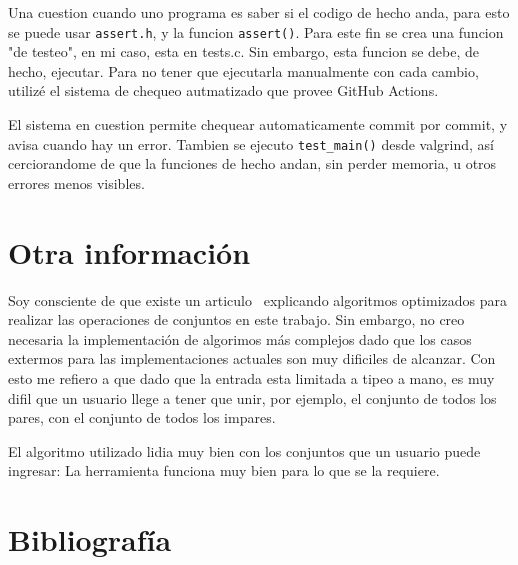 \documentclass{article}
\begin{document}
	Una cuestion cuando uno programa es saber si el codigo de hecho anda, para esto se puede usar \verb|assert.h|, y la funcion \verb|assert()|. Para este fin se crea una funcion "de testeo", en mi caso, esta en tests.c. Sin embargo, esta funcion se debe, de hecho, ejecutar. Para no tener que ejecutarla manualmente con cada cambio, utilizé el sistema de chequeo autmatizado que provee GitHub Actions. 
	
	El sistema en cuestion permite chequear automaticamente commit por commit, y avisa cuando hay un error. Tambien se ejecuto \verb|test_main()| desde valgrind, así cerciorandome de que la funciones de hecho andan, sin perder memoria, u 
	otros errores menos visibles.

	\section*{Otra información}

	Soy consciente de que existe un articulo~\cite{DBLP:journals/corr/BlellochFS16} explicando algoritmos optimizados para realizar las operaciones de conjuntos en este trabajo. Sin embargo, no creo necesaria la implementación de algorimos más complejos dado que los casos extermos para las implementaciones actuales son muy dificiles de alcanzar. Con esto me refiero a que dado que la entrada esta limitada a tipeo a mano, es muy difil que un usuario llege a tener que unir, por ejemplo, el conjunto de todos los pares, con el conjunto de todos los impares.
	
	El algoritmo utilizado lidia muy bien con los conjuntos que un usuario puede ingresar: La herramienta funciona muy bien para lo que se la requiere.

	\section*{Bibliografía}
	
	\nocite{*}
	\printbibliography[heading=none]
	
\end{document}

